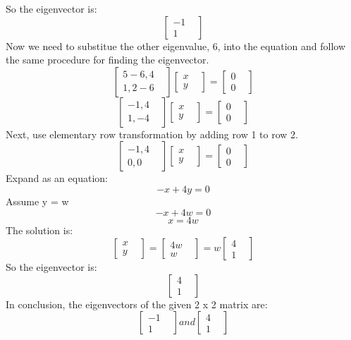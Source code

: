 So the eigenvector is:
$$\begin{bmatrix}
-1&  \\
1&
\end{bmatrix}$$
Now we need to substitue the other eigenvalue, 6, into the equation and follow the same procedure for finding the eigenvector. 
$$\begin{bmatrix}
5-6, 4 &  \\
 1, 2-6& 
\end{bmatrix}
\begin{bmatrix}
x&  \\
 y& 
\end{bmatrix} = 
\begin{bmatrix}
0&  \\
0& 
\end{bmatrix}$$
$$\begin{bmatrix}
-1, 4 &  \\
 1, -4& 
\end{bmatrix}
\begin{bmatrix}
x&  \\
 y& 
\end{bmatrix} = 
\begin{bmatrix}
0&  \\
0& 
\end{bmatrix}$$
Next, use elementary row transformation by adding row 1 to row 2.
$$\begin{bmatrix}
-1, 4 &  \\
 0, 0& 
\end{bmatrix}
\begin{bmatrix}
x&  \\
 y& 
\end{bmatrix} = 
\begin{bmatrix}
0&  \\
0& 
\end{bmatrix}$$
Expand as an equation:
$$-x + 4y = 0$$
Assume y = w
$$-x + 4w = 0$$
$$x = 4w$$
The solution is:
$$\begin{bmatrix}
x&  \\
y& 
\end{bmatrix}=
\begin{bmatrix}
4w&  \\
w& 
\end{bmatrix} =
w\begin{bmatrix}
4&  \\
1& 
\end{bmatrix}$$
So the eigenvector is:
$$\begin{bmatrix}
4&  \\
1&
\end{bmatrix}$$
In conclusion, the eigenvectors of the given 2 x 2 matrix are:
$$\begin{bmatrix}
-1&  \\
1&
\end{bmatrix}
and \begin{bmatrix}
4&  \\
1&
\end{bmatrix}$$

